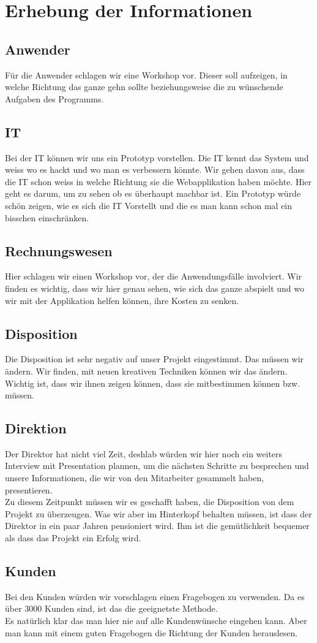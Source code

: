 \section{Erhebung der Informationen}
\subsection{Anwender}
Für die Anwender schlagen wir eine Workshop vor. Dieser soll aufzeigen, in welche Richtung das ganze gehn sollte beziehungsweise die zu wünschende Aufgaben des Programms.
%
\subsection{IT}
Bei der IT können wir uns ein Prototyp vorstellen. Die IT kennt das System und weiss wo es hackt und wo man es verbessern könnte. Wir gehen davon aus, dass die IT schon weiss in welche Richtung sie die Webapplikation haben möchte. Hier geht es darum, um zu sehen ob es überhaupt machbar ist. Ein Prototyp würde schön zeigen, wie es sich die IT Vorstellt und die es man kann schon mal ein bisschen einschränken.
%
\subsection{Rechnungswesen}
Hier schlagen wir einen Workshop vor, der die Anwendungsfälle involviert. Wir finden es wichtig, dass wir hier genau sehen, wie sich das ganze abspielt und wo wir mit der Applikation helfen können, ihre Kosten zu senken.
%
\subsection{Disposition}
Die Disposition ist sehr negativ auf unser Projekt eingestimmt. Das müssen wir ändern. Wir finden, mit neuen kreativen Techniken können wir das ändern. Wichtig ist, dass wir ihnen zeigen können, dass sie mitbestimmen können bzw. müssen. 
%
\subsection{Direktion}
Der Direktor hat nicht viel Zeit, deshlab würden wir hier noch ein weiters Interview mit Presentation plannen, um die nächsten Schritte zu besprechen und unsere Informationen, die wir von den Mitarbeiter gesammelt haben, presentieren.\\
Zu diesem Zeitpunkt müssen wir es geschafft haben, die Disposition von dem Projekt zu überzeugen. Was wir aber im Hinterkopf behalten müssen, ist dass der Direktor in ein paar Jahren pensioniert wird. Ihm ist die gemütlichkeit bequemer als dass das Projekt ein Erfolg wird.
%
\subsection{Kunden}
Bei den Kunden würden wir vorschlagen einen Fragebogen zu verwenden. Da es über 3000 Kunden sind, ist das die geeignetste Methode.\\
Es natürlich klar das man hier nie auf alle Kundenwünsche eingehen kann. Aber man kann mit einem guten Fragebogen die Richtung der Kunden herauslesen.